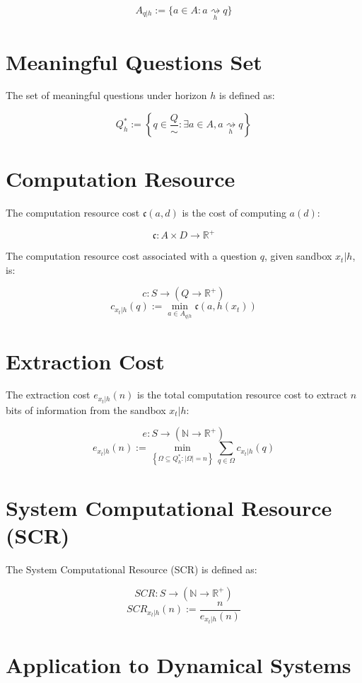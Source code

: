 \documentclass[11pt,a4paper]{article}
\theoremstyle{definition}
\theoremstyle{remark}
\numberwithin{equation}{section}
\begin{document}
\[
A_{q|h} := \{ a \in A : a \underset{h}{\rightsquigarrow} q \}
\]

\section{Meaningful Questions Set}

The set of meaningful questions under horizon $h$ is defined as:

\[
Q^*_h := \left\{ q \in \frac{Q}{\sim} : \exists a \in A , a \underset{h}{\rightsquigarrow} q \right\}
\]

\section{Computation Resource}

The computation resource cost $\mathfrak{c}(a,d)$ is the cost of computing $a(d)$:

\[
\mathfrak{c} : A \times D \rightarrow \mathbb{R}^+
\]

The computation resource cost associated with a question $q$, given sandbox $x_t|h$, is:

\[
c : S \rightarrow (Q \rightarrow \mathbb{R}^+)
\]
\[
c_{x_t|h}(q) := \min_{a \in A_{q|h}} \mathfrak{c}(a, h(x_t))
\]

\section{Extraction Cost}

The extraction cost $e_{x_t|h}(n)$ is the total computation resource cost to extract $n$ bits of information from the sandbox $x_t|h$:

\[
e : S \rightarrow (\mathbb{N} \rightarrow \mathbb{R}^+)
\]
\[
e_{x_t|h}(n) := \min_{\left\{ \Omega \subseteq Q^*_h : |\Omega| = n \right\}} \sum_{q \in \Omega} c_{x_t|h}(q)
\]

\section{System Computational Resource (SCR)}

The System Computational Resource (SCR) is defined as:

\[
SCR : S \rightarrow (\mathbb{N} \rightarrow \mathbb{R}^+)
\]
\[
SCR_{x_t|h}(n) := \frac{n}{e_{x_t|h}(n)}
\]

\section{Application to Dynamical Systems}
\end{document}
